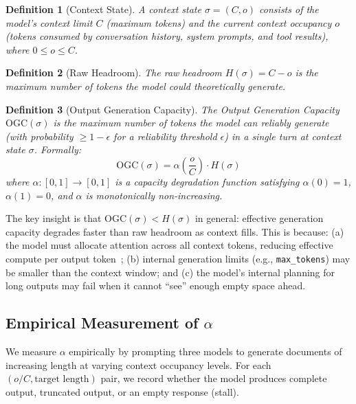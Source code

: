 \documentclass[11pt,twocolumn]{article}
\newtheorem{definition}{Definition}
\newcommand{\ogc}{\mathrm{OGC}}
\begin{document}
\begin{definition}[Context State]
\label{def:context}
A \emph{context state} $\sigma = (C, o)$ consists of the model's
context limit $C$ (maximum tokens) and the current context
occupancy $o$ (tokens consumed by conversation history, system
prompts, and tool results), where $0 \leq o \leq C$.
\end{definition}

\begin{definition}[Raw Headroom]
\label{def:headroom}
The \emph{raw headroom} $H(\sigma) = C - o$ is the maximum
number of tokens the model could theoretically generate.
\end{definition}

\begin{definition}[Output Generation Capacity]
\label{def:ogc}
The \emph{Output Generation Capacity} $\ogc(\sigma)$ is the
maximum number of tokens the model can \emph{reliably} generate
(with probability $\geq 1 - \epsilon$ for a reliability threshold
$\epsilon$) in a single turn at context state $\sigma$.
Formally:
\begin{equation}
\ogc(\sigma) = \alpha\!\left(\frac{o}{C}\right) \cdot H(\sigma)
\end{equation}
where $\alpha: [0,1] \to [0,1]$ is a \emph{capacity degradation
function} satisfying $\alpha(0) = 1$, $\alpha(1) = 0$, and
$\alpha$ is monotonically non-increasing.
\end{definition}

The key insight is that $\ogc(\sigma) < H(\sigma)$ in general:
effective generation capacity degrades faster than raw headroom
as context fills.  This is because:
(a) the model must allocate attention across all context tokens,
reducing effective compute per output token~\cite{vaswani2017attention,liu2024lost};
(b) internal generation limits (e.g., \texttt{max\_tokens}) may
be smaller than the context window; and
(c) the model's internal planning for long outputs may fail when
it cannot ``see'' enough empty space ahead.

\subsection{Empirical Measurement of $\alpha$}

We measure $\alpha$ empirically by prompting three models to
generate documents of increasing length at varying context
occupancy levels.  For each $(o/C, \text{target length})$ pair,
we record whether the model produces complete output, truncated
output, or an empty response (stall).
\end{document}

